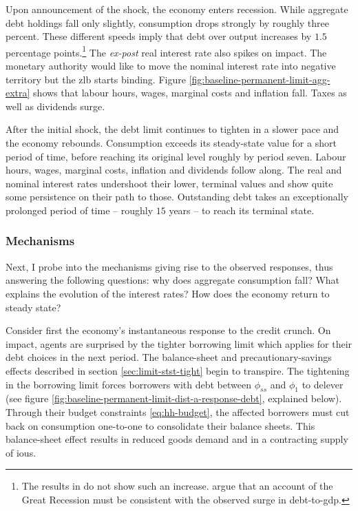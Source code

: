 \documentclass[a4paper,12pt]{article} %
\numberwithin{equation}{section} %
\numberwithin{figure}{section}
\numberwithin{table}{section}
\begin{document}
Upon announcement of the shock, the economy enters recession. While aggregate debt holdings fall only slightly, consumption drops strongly by roughly three percent. These different speeds imply that debt over output increases by $1.5$ percentage points.\footnote{The results in \textcite{gl2017} do not show such an increase. \textcite{justiniano2015} argue that an account of the Great Recession must be consistent with the observed surge in debt-to-\Gls{gdp}.} The \textit{ex-post} real interest rate also spikes on impact. The monetary authority would like to move the nominal interest rate into negative territory but the \Gls{zlb} starts binding. Figure \ref{fig:baseline-permanent-limit-agg-extra} shows that labour hours, wages, marginal costs and inflation fall. Taxes as well as dividends surge.

After the initial shock, the debt limit continues to tighten in a slower pace and the economy rebounds. Consumption exceeds its steady-state value for a short period of time, before reaching its original level roughly by period seven. Labour hours, wages, marginal costs, inflation and dividends follow along. The real and nominal interest rates undershoot their lower, terminal values and show quite some persistence on their path to those. Outstanding debt takes an exceptionally prolonged period of time -- roughly $15$ years -- to reach its terminal state. 

\subsubsection{Mechanisms}
\label{sec:limit-transition-mechanisms}

Next, I probe into the mechanisms giving rise to the observed responses, thus answering the following questions: why does aggregate consumption fall? What explains the evolution of the interest rates? How does the economy return to steady state?

Consider first the economy's instantaneous response to the credit crunch. On impact, agents are surprised by the tighter borrowing limit which applies for their debt choices in the next period. The balance-sheet and precautionary-savings effects described in section \ref{sec:limit-stst-tight} begin to transpire. The tightening in the borrowing limit forces borrowers with debt between $\phi_{ss}$ and $\phi_1$ to delever (see figure \ref{fig:baseline-permanent-limit-dist-a-response-debt}, explained below). Through their budget constraints \eqref{eq:hh-budget}, the affected borrowers must cut back on consumption one-to-one to consolidate their balance sheets. This balance-sheet effect results in reduced goods demand and in a contracting supply of \Gls{iou}s.
\end{document}
